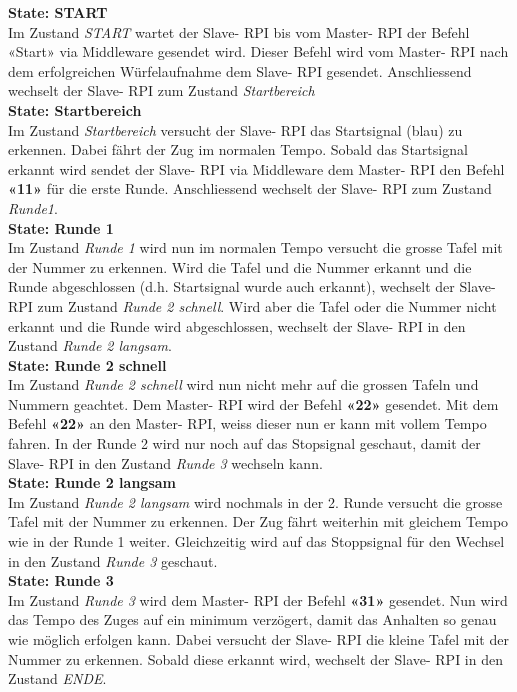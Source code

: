 \documentclass[../../main.tex]{subfiles}
\begin{document}
\newpage

\textbf{State: START}\\
Im Zustand \textit{START} wartet der Slave- RPI bis vom Master- RPI der Befehl «Start» via Middleware gesendet wird. Dieser Befehl wird vom Master- RPI nach dem erfolgreichen Würfelaufnahme dem Slave- RPI gesendet. Anschliessend wechselt der Slave- RPI zum Zustand \textit{Startbereich}\\

\textbf{State: Startbereich}\\
Im Zustand \textit{Startbereich} versucht der Slave- RPI das Startsignal (blau) zu erkennen. Dabei fährt der Zug im normalen Tempo. Sobald das Startsignal erkannt wird sendet der Slave- RPI via Middleware dem Master- RPI den Befehl \textbf{«11»} für die erste Runde. Anschliessend wechselt der Slave- RPI zum Zustand \textit{Runde1}.\\

\textbf{State: Runde 1}\\
Im Zustand \textit{Runde 1} wird nun im normalen Tempo versucht die grosse Tafel mit der Nummer zu erkennen. Wird die Tafel und die Nummer erkannt und die Runde abgeschlossen (d.h. Startsignal wurde auch erkannt), wechselt der Slave- RPI zum Zustand \textit{Runde 2 schnell}. Wird aber die Tafel oder die Nummer nicht erkannt und die Runde wird abgeschlossen, wechselt der Slave- RPI in den Zustand \textit{Runde 2 langsam}.\\

\textbf{State: Runde 2 schnell}\\
Im Zustand \textit{Runde 2 schnell} wird nun nicht mehr auf die grossen Tafeln und Nummern geachtet. Dem Master- RPI wird der Befehl \textbf{«22»} gesendet. Mit dem Befehl \textbf{«22»} an den Master- RPI, weiss dieser nun er kann mit vollem Tempo fahren. In der Runde 2 wird nur noch auf das Stopsignal geschaut, damit der Slave- RPI in den Zustand \textit{Runde 3} wechseln kann.\\

\textbf{State: Runde 2 langsam}\\
Im Zustand \textit{Runde 2 langsam} wird nochmals in der 2. Runde versucht die grosse Tafel mit der Nummer zu erkennen. Der Zug fährt weiterhin mit gleichem Tempo wie in der Runde 1 weiter. Gleichzeitig wird auf das Stoppsignal für den Wechsel in den Zustand \textit{Runde 3} geschaut.\\

\textbf{State: Runde 3}\\
Im Zustand \textit{Runde 3} wird dem Master- RPI der Befehl \textbf{«31»} gesendet. Nun wird das Tempo des Zuges auf ein minimum verzögert, damit das Anhalten so genau wie möglich erfolgen kann. Dabei versucht der Slave- RPI die kleine Tafel mit der Nummer zu erkennen. Sobald diese erkannt wird, wechselt der Slave- RPI in den Zustand \textit{ENDE}.\\
\end{document}
